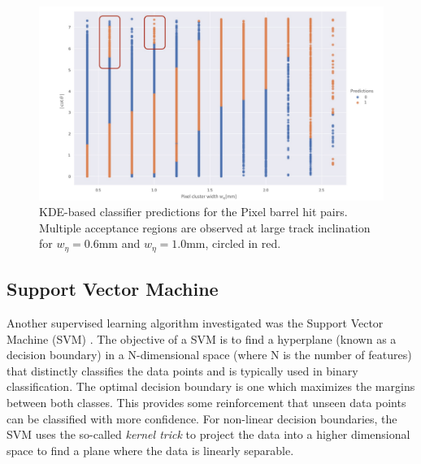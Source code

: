 \begin{figure}[!htbp]
\centering
\includegraphics[width=0.88\linewidth]{images/4-ml-based-predictor/Multiple_acceptance_regions.pdf}
\caption{KDE-based classifier predictions for the Pixel barrel hit pairs. Multiple acceptance regions are observed at large track inclination for $w_{\eta} = 0.6$mm and $w_{\eta} = 1.0$mm, circled in red.}
\label{fig:multiple-acceptance}
\end{figure}


\subsection{Support Vector Machine}


Another supervised learning algorithm investigated was the Support Vector Machine (SVM) \cite{svm}. The objective of a SVM is to find a hyperplane (known as a decision boundary) in a N-dimensional space (where N is the number of features) that distinctly classifies the data points and is typically used in binary classification. The optimal decision boundary is one which maximizes the margins between both classes. This provides some reinforcement that unseen data points can be classified with more confidence. For non-linear decision boundaries, the SVM uses the so-called \textit{kernel trick} to project the data into a higher dimensional space to find a plane where the data is linearly separable. 

